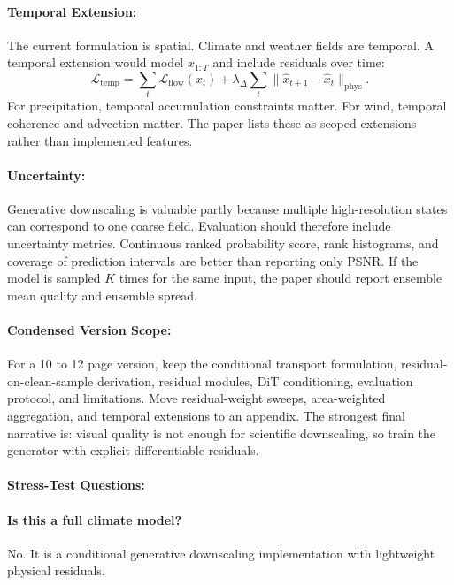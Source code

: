\documentclass{article}
\begin{document}
\paragraph{Temporal Extension:}

The current formulation is spatial. Climate and weather fields are temporal. A temporal extension would model $x_{1:T}$ and include residuals over time:
\begin{equation}
  \mathcal{L}_{\text{temp}}=\sum_t\mathcal{L}_{\text{flow}}(x_t)+
  \lambda_{\Delta}\sum_t\|\hat{x}_{t+1}-\hat{x}_{t}\|_{\text{phys}}.
\end{equation}
For precipitation, temporal accumulation constraints matter. For wind, temporal coherence and advection matter. The paper lists these as scoped extensions rather than implemented features.

\paragraph{Uncertainty:}

Generative downscaling is valuable partly because multiple high-resolution states can correspond to one coarse field. Evaluation should therefore include uncertainty metrics. Continuous ranked probability score, rank histograms, and coverage of prediction intervals are better than reporting only PSNR. If the model is sampled $K$ times for the same input, the paper should report ensemble mean quality and ensemble spread.

\paragraph{Condensed Version Scope:}

For a 10 to 12 page version, keep the conditional transport formulation, residual-on-clean-sample derivation, residual modules, DiT conditioning, evaluation protocol, and limitations. Move residual-weight sweeps, area-weighted aggregation, and temporal extensions to an appendix. The strongest final narrative is: visual quality is not enough for scientific downscaling, so train the generator with explicit differentiable residuals.

\paragraph{Stress-Test Questions:}

\paragraph{Is this a full climate model?}
No. It is a conditional generative downscaling implementation with lightweight physical residuals.
\end{document}
